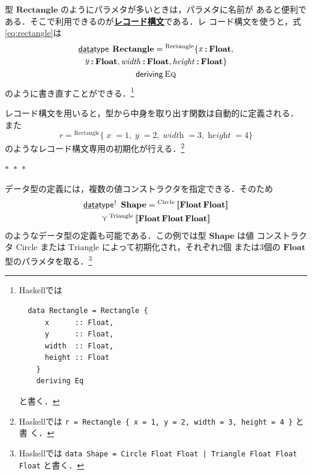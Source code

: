 \documentclass[a5paper,twoside,fleqn]{jsbook}
\def\[{\left[\!\left[}
\def\]{\right]\!\right]}
\newcommand{\separator}{\begin{center}$*$~$*$~$*$\end{center}}
\newcommand{\programminglanguage}[1]{\textsf{#1}}
\newcommand{\haskell}{\programminglanguage{Haskell}}
\newcommand{\keyword}[1]{{\underline{\textbf{#1}}}}
\newcommand{\code}[1]{\texttt{#1}}
\newcommand{\mKeyword}[1]{\mathsf{#1}} %
\newcommand{\mKeywordUnderline}[1]{\text{\underline{\textsf{#1}}}} %
\newcommand{\mDataTypeKeyword}{\mKeywordUnderline{data}\mKeyword{type}}
\newcommand{\mDerivingKeyword}{\mKeyword{deriving}}
\DeclareMathOperator{\mDataType}{\mDataTypeKeyword}
\DeclareMathOperator{\mDataTypeParametric}{\mDataTypeKeyword^\dagger}
\DeclareMathOperator{\mDeriving}{\mDerivingKeyword}
\newcommand{\mFunc}[1]{\mathop{\mathit{#1}}}
\DeclareMathOperator{\mIn}{{:\!:}}
\DeclareMathOperator{\mValueOr}{\curlyvee}
\newcommand{\mType}[1]{\mathbf{#1}}
\newcommand{\mFloatType}{\mType{Float}}
\newcommand{\mGenericValueConstructor}[1]{\mathrm{#1}}
\newcommand{\mGenericWith}[2]{{}^\mGenericValueConstructor{#1}\[#2\]}
\newcommand{\mGenericRecordWith}[2]{{}^\mGenericValueConstructor{#1}\{#2\}}
\newcommand{\mGenericRecordBeginWith}[1]{{}^\mGenericValueConstructor{#1}\{}
\newcommand{\mGenericRecordEnd}{\}}
\newcommand{\mGenericTypeClass}[1]{\textsc{#1}} %
\newcommand{\mEqTypeClass}{\mGenericTypeClass{Eq}}
\begin{document}
型 $\mType{Rectangle}$ のようにパラメタが多いときは，パラメタに名前が
あると便利である．そこで利用できるのが\keyword{レコード構文}である．レ
コード構文を使うと，式\eqref{eq:rectangle}は
\begin{multline}
\mDataType\;
\mType{Rectangle}
=\mGenericRecordBeginWith{Rectangle}
\mFunc{x}\mIn\mFloatType,\\
\mFunc{y}\mIn\mFloatType,
\mFunc{width}\mIn\mFloatType,
\mFunc{height}\mIn\mFloatType
\mGenericRecordEnd\\
\mDeriving\mEqTypeClass
\end{multline}
のように書き直すことができる．\footnote{\haskell では
\begin{verbatim}
  data Rectangle = Rectangle {
      x      :: Float,
      y      :: Float,
      width  :: Float,
      height :: Float
    }
    deriving Eq
\end{verbatim}
と書く．}

レコード構文を用いると，型から中身を取り出す関数は自動的に定義される．
また
\begin{equation}
r=\mGenericRecordWith{Rectangle}{\mFunc{x}=1,
  \mFunc{y}=2,
  \mFunc{width}=3,
  \mFunc{height}=4}
\end{equation}
のようなレコード構文専用の初期化が行える．\footnote{\haskell では
\code{r = Rectangle \{ x = 1, y = 2, width = 3, height = 4 \}} と書
く．}

\separator

データ型の定義には，複数の値コンストラクタを指定できる．そのため
\begin{multline}
\mDataTypeParametric\;\mType{Shape}
=\mGenericWith{Circle}{\mFloatType\,\mFloatType}\\
\mValueOr
\mGenericWith{Triangle}{\mFloatType\,\mFloatType\,\mFloatType}
\end{multline}
のようなデータ型の定義も可能である．この例では型 $\mType{Shape}$ は値
コンストラクタ $\mGenericValueConstructor{Circle}$ または
$\mGenericValueConstructor{Triangle}$ によって初期化され，それぞれ2個
または3個の $\mFloatType$ 型のパラメタを取る．\footnote{\haskell では
\code{data Shape = Circle Float Float | Triangle Float Float Float}
と書く．}
\end{document}
